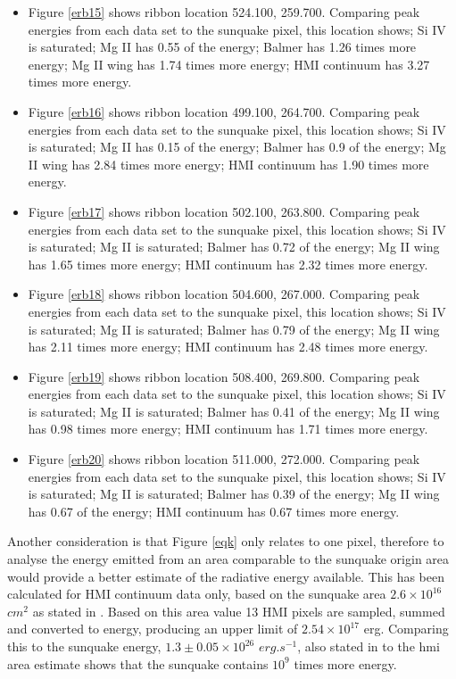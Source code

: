 \begin{itemize}
\item Figure \ref{erb15} shows ribbon location 524.100, 259.700. Comparing peak energies from each data set to the sunquake pixel, this location shows; Si IV is saturated; Mg II has 0.55 of the energy; Balmer has 1.26 times more energy; Mg II wing has 1.74 times more energy; HMI continuum has 3.27 times more energy.


\item Figure \ref{erb16} shows ribbon location 499.100, 264.700. Comparing peak energies from each data set to the sunquake pixel, this location shows; Si IV is saturated; Mg II has 0.15 of the energy; Balmer has 0.9 of the energy; Mg II wing has 2.84 times more energy; HMI continuum has 1.90 times more energy.


\item Figure \ref{erb17} shows ribbon location 502.100, 263.800. Comparing peak energies from each data set to the sunquake pixel, this location shows; Si IV is saturated; Mg II is saturated; Balmer has 0.72 of the energy; Mg II wing has 1.65 times more energy; HMI continuum has 2.32 times more energy.


\item Figure \ref{erb18} shows ribbon location 504.600, 267.000. Comparing peak energies from each data set to the sunquake pixel, this location shows; Si IV is saturated; Mg II is saturated; Balmer has 0.79 of the energy; Mg II wing has 2.11 times more energy; HMI continuum has 2.48 times more energy.



\item Figure \ref{erb19} shows ribbon location 508.400, 269.800. Comparing peak energies from each data set to the sunquake pixel, this location shows; Si IV is saturated; Mg II is saturated; Balmer has 0.41 of the energy; Mg II wing has 0.98 times more energy; HMI continuum has 1.71 times more energy.



\item Figure \ref{erb20} shows ribbon location 511.000, 272.000. Comparing peak energies from each data set to the sunquake pixel, this location shows; Si IV is saturated; Mg II is saturated; Balmer has 0.39 of the energy; Mg II wing has 0.67 of the energy; HMI continuum has 0.67 times more energy.
\end{itemize}

Another consideration is that Figure \ref{eqk} only relates to one pixel, therefore to analyse the energy emitted from an area comparable to the sunquake origin area would provide a better estimate of the radiative energy available. This has been calculated for HMI continuum data only, based on the sunquake area $2.6{\times}10^{16}$ $cm^{2}$ as stated in \cite{2014ApJ...796...85J}. Based on this area value 13 HMI pixels are sampled, summed and converted to energy, producing an upper limit of $2.54{\times}10^{17}$ erg. Comparing this to the sunquake energy, $1.3\pm0.05{\times}10^{26}$ $erg.s^{-1}$, also stated in \cite{2014ApJ...796...85J} to the hmi area estimate shows that the sunquake contains $10^{9}$ times more energy. 





